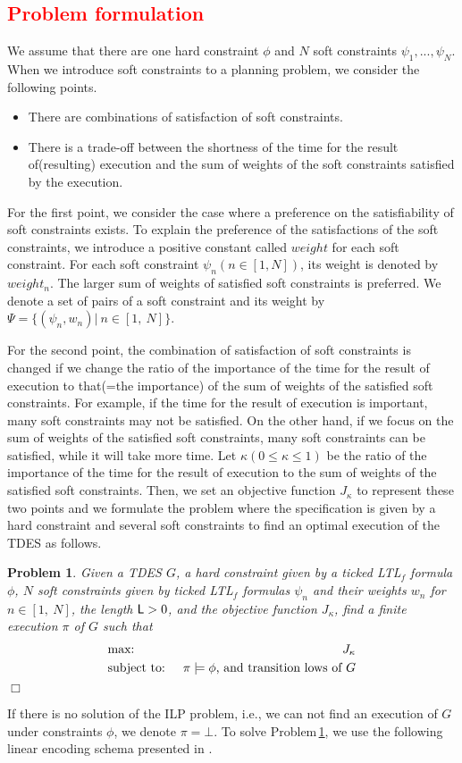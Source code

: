 \documentclass[journal,twoside,web]{IEEEtran}
\newcommand{\qedwhite}{\hfill \ensuremath{\Box}}
\newtheorem{pbm}{Problem}
\newcommand{\rpbm}[1]{Problem\,\ref{#1}}
\newcommand{\Len}{{\sf L}}
\newcommand{\red}[1]{\textcolor{red}{#1}}
\begin{document}
%
\red{
\subsection{Problem formulation}\label{sec:pbm}
}
%
We assume that there are one hard constraint $\phi$ and $N$ soft constraints $\psi_1,...,\psi_N$. 
When we introduce soft constraints to a planning problem, we consider the following points.
\begin{itemize}
\item
There are combinations of satisfaction of soft constraints.
\item
There is a trade-off between the shortness of the time for the result of(resulting) execution and the sum of weights of the soft constraints satisfied by the execution.
\end{itemize}

For the first point, we consider the case where a preference on the satisfiability of soft constraints exists.
To explain the preference of the satisfactions of the soft constraints, we introduce a positive constant called $weight$ for each soft constraint.
For each soft constraint $\psi_n (n \in [1,N])$, its weight is denoted by $weight_n$. The larger sum of weights of satisfied soft constraints is preferred.
We denote a set of pairs of a soft constraint and its weight by $\Psi=\{(\psi_n,w_n)|~n\in[1,~N]\}$.

For the second point, 
the combination of satisfaction of soft constraints is changed if we change the ratio of the importance of the time for the result of execution to that(=the importance) of the sum of weights of the satisfied soft constraints.
For example, if the time for the result of execution is important, many soft constraints may not be satisfied. 
On the other hand, if we focus on the sum of weights of the satisfied soft constraints, many soft constraints can be satisfied, while it will take more time.
Let $\kappa(0\leq\kappa\leq1)$ be the ratio of the importance of the time for the result of execution to the sum of weights of the satisfied soft constraints.
Then, we set an objective function 
$J_\kappa$
to represent these two points and we formulate the problem where the specification is given by a hard constraint and several soft constraints to find an optimal execution of the TDES as follows.
%
\begin{pbm}\label{pbm2}
Given a TDES $G$, a hard constraint given by a ticked LTL$_f$ formula $\phi$, $N$ soft constraints given by ticked LTL$_f$ formulas $\psi_{n}$ and their weights $w_n$ for $n\in[1,\ N]$, the length $\Len>0$, and the objective function $J_\kappa$,
find a finite execution $\pi$ of $G$ such that
\begin{eqnarray}
&\mbox{max: }&J_\kappa \notag \\
&\mbox{subject to: }&\pi \models \phi\mbox{, and transition lows of }G\notag
\end{eqnarray}
\qedwhite
\end{pbm}
%
If there is no solution of the ILP problem, i.e., we can not find an execution of $G$ under constraints $\phi$, we denote $\pi=\bot$.
%
To solve \rpbm{pbm2}, we use the following linear encoding schema presented in \cite{KHU2020}.
%
\end{document}
